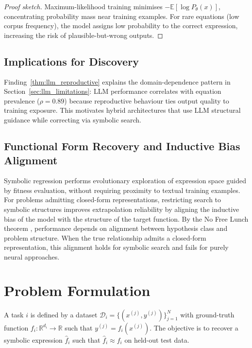 \documentclass[twoside,11pt]{article}
\begin{document}
\begin{proof}[Proof sketch]
Maximum-likelihood training minimises $-\mathbb{E}[\log P_\theta(x)]$, concentrating probability mass near training examples. For rare equations (low corpus frequency), the model assigns low probability to the correct expression, increasing the risk of plausible-but-wrong outputs.
\end{proof}

\subsection{Implications for Discovery}\label{subsec:implications-for-discovery}
\label{sec:theory_implications}

Finding~\ref{thm:llm_reproductive} explains the domain-dependence pattern in Section~\ref{sec:llm_limitations}: LLM performance correlates with equation prevalence ($\rho = 0.89$) because reproductive behaviour ties output quality to training exposure. This motivates hybrid architectures that use LLM structural guidance while correcting via symbolic search.

\subsection{Functional Form Recovery and Inductive Bias Alignment}\label{subsec:functional-form-recovery-and-inductive-b}
\label{sec:theory_recovery}

Symbolic regression performs evolutionary exploration of expression space guided by fitness evaluation, without requiring proximity to textual training examples. For problems admitting closed-form representations, restricting search to symbolic structures improves extrapolation reliability by aligning the inductive bias of the model with the structure of the target function. By the No Free Lunch theorem \citep{wolpert1997no}, performance depends on alignment between hypothesis class and problem structure. When the true relationship admits a closed-form representation, this alignment holds for symbolic search and fails for purely neural approaches.

\section{Problem Formulation}
\label{sec:problem}

\begin{definition}
A task $i$ is defined by a dataset $\mathcal{D}_i = \{(x^{(j)}, y^{(j)})\}_{j=1}^{N}$
with ground-truth function $f_i: \mathbb{R}^{d_i} \to \mathbb{R}$ such that
$y^{(j)} = f_i(x^{(j)})$.  The objective is to recover a symbolic expression
$\hat{f}_i$ such that $\hat{f}_i \approx f_i$ on held-out test data.
\end{definition}
\end{document}
